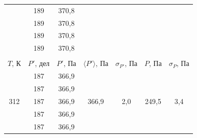 \documentclass[a4paper,12pt]{article} %
\begin{document}
\begin{table}[H]
\begin{tabular}{ccccccc}
		\multicolumn{1}{|c|}{} &
		\multicolumn{1}{c|}{189} &
		\multicolumn{1}{c|}{370,8} &
		\multicolumn{1}{c|}{} &
		\multicolumn{1}{c|}{} &
		\multicolumn{1}{c|}{} &
		\multicolumn{1}{c|}{} \\ \cline{2-3}
		\multicolumn{1}{|c|}{} &
		\multicolumn{1}{c|}{189} &
		\multicolumn{1}{c|}{370,8} &
		\multicolumn{1}{c|}{} &
		\multicolumn{1}{c|}{} &
		\multicolumn{1}{c|}{} &
		\multicolumn{1}{c|}{} \\ \cline{2-3}
		\multicolumn{1}{|c|}{} &
		\multicolumn{1}{c|}{189} &
		\multicolumn{1}{c|}{370,8} &
		\multicolumn{1}{c|}{} &
		\multicolumn{1}{c|}{} &
		\multicolumn{1}{c|}{} &
		\multicolumn{1}{c|}{} \\ \cline{2-3}
		\multicolumn{1}{|c|}{} &
		\multicolumn{1}{c|}{189} &
		\multicolumn{1}{c|}{370,8} &
		\multicolumn{1}{c|}{} &
		\multicolumn{1}{c|}{} &
		\multicolumn{1}{c|}{} &
		\multicolumn{1}{c|}{} \\ \hline
		&
		&
		&
		&
		&
		&
		\\ \hline
		\multicolumn{1}{|c|}{$ T $, К} &
		\multicolumn{1}{c|}{$ P' $, дел} &
		\multicolumn{1}{c|}{$ P' $, Па} &
		\multicolumn{1}{c|}{$ \langle P' \rangle $, Па} &
		\multicolumn{1}{c|}{$ \sigma_{P'} $, Па} &
		\multicolumn{1}{c|}{$ P $, Па} &
		\multicolumn{1}{c|}{$ \sigma_P $, Па} \\ \hline
		\multicolumn{1}{|c|}{\multirow{5}{*}{312}} &
		\multicolumn{1}{c|}{187} &
		\multicolumn{1}{c|}{366,9} &
		\multicolumn{1}{c|}{\multirow{5}{*}{366,9}} &
		\multicolumn{1}{c|}{\multirow{5}{*}{2,0}} &
		\multicolumn{1}{c|}{\multirow{5}{*}{249,5}} &
		\multicolumn{1}{c|}{\multirow{5}{*}{3,4}} \\ \cline{2-3}
		\multicolumn{1}{|c|}{} &
		\multicolumn{1}{c|}{187} &
		\multicolumn{1}{c|}{366,9} &
		\multicolumn{1}{c|}{} &
		\multicolumn{1}{c|}{} &
		\multicolumn{1}{c|}{} &
		\multicolumn{1}{c|}{} \\ \cline{2-3}
		\multicolumn{1}{|c|}{} &
		\multicolumn{1}{c|}{187} &
		\multicolumn{1}{c|}{366,9} &
		\multicolumn{1}{c|}{} &
		\multicolumn{1}{c|}{} &
		\multicolumn{1}{c|}{} &
		\multicolumn{1}{c|}{} \\ \cline{2-3}
		\multicolumn{1}{|c|}{} &
		\multicolumn{1}{c|}{187} &
		\multicolumn{1}{c|}{366,9} &
		\multicolumn{1}{c|}{} &
		\multicolumn{1}{c|}{} &
		\multicolumn{1}{c|}{} &
		\multicolumn{1}{c|}{} \\ \cline{2-3}
		\multicolumn{1}{|c|}{} &
		\multicolumn{1}{c|}{187} &
		\multicolumn{1}{c|}{366,9} &
		\multicolumn{1}{c|}{} &
		\multicolumn{1}{c|}{} &
		\multicolumn{1}{c|}{} &

\end{tabular}
\end{table}
\end{document}
